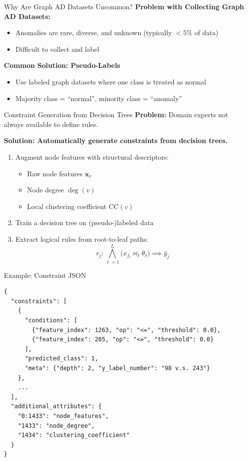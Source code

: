 \documentclass[aspectratio=169]{beamer}
\begin{document}
\begin{frame}{Why Are Graph AD Datasets Uncommon?}
    \textbf{Problem with Collecting Graph AD Datasets:}
    \begin{itemize}
        \item Anomalies are rare, diverse, and unknown (typically $< 5\%$ of data)
        \item Difficult to collect and label
    \end{itemize}

    \textbf{Common Solution: Pseudo-Labels}
    \begin{itemize}
        \item Use labeled graph datasets where one class is treated as normal
        \item Majority class = ``normal'', minority class = ``anomaly''
    \end{itemize}
\end{frame}

\begin{frame}{Constraint Generation from Decision Trees}
    \textbf{Problem:} Domain experts not always available to define rules.

    \textbf{Solution: Automatically generate constraints from decision trees.}

    \begin{enumerate}
        \item Augment node features with structural descriptors:
        \begin{itemize}
            \item Raw node features $\mathbf{x}_v$
            \item Node degree $\deg(v)$
            \item Local clustering coefficient $\text{CC}(v)$
        \end{itemize}
        \item Train a decision tree on (pseudo-)labeled data
        \item Extract logical rules from root-to-leaf paths:
        \[
        r_j: \bigwedge_{\ell=1}^{L} \bigl( x_{f_\ell} \bowtie_\ell \theta_\ell \bigr) \implies \hat{y}_j
        \]
    \end{enumerate}
\end{frame}

\begin{frame}[fragile]{Example: Constraint JSON}
    \begin{small}
    \begin{verbatim}
{
  "constraints": [
    {
      "conditions": [
        {"feature_index": 1263, "op": "<=", "threshold": 0.0},
        {"feature_index": 205, "op": "<=", "threshold": 0.0}
      ],
      "predicted_class": 1,
      "meta": {"depth": 2, "y_label_number": "98 v.s. 243"}
    },
    ...
  ],
  "additional_attributes": {
    "0:1433": "node_features",
    "1433": "node_degree",
    "1434": "clustering_coefficient"
  }
}
    \end{verbatim}
    \end{small}
\end{frame}
\end{document}

